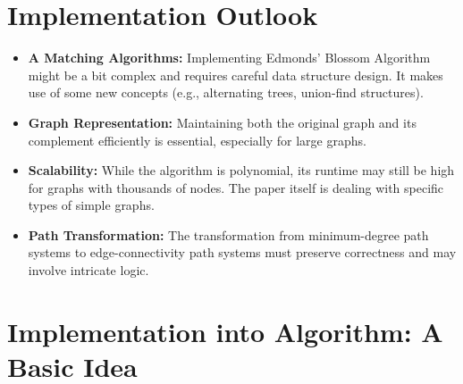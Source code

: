 \documentclass[12pt]{article}
\begin{document}
\section*{Implementation Outlook}

\begin{itemize}
    \item \textbf{A Matching Algorithms:} Implementing Edmonds' Blossom Algorithm might be a bit complex and requires careful data structure design. It makes use of some new concepts (e.g., alternating trees, union-find structures).
    \item \textbf{Graph Representation:} Maintaining both the original graph and its complement efficiently is essential, especially for large graphs.
    \item \textbf{Scalability:} While the algorithm is polynomial, its runtime may still be high for graphs with thousands of nodes. The paper itself is dealing with specific types of simple graphs.
    \item \textbf{Path Transformation:} The transformation from minimum-degree path systems to edge-connectivity path systems must preserve correctness and may involve intricate logic.
\end{itemize}

\section*{Implementation into Algorithm: A Basic Idea}
\end{document}
